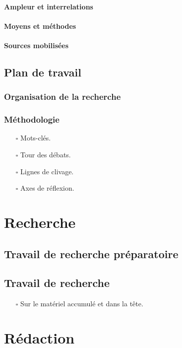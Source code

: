 \documentclass[paper=A4,portrait,twoside=true,twocolumn=false,headinclude=false,footinclude=false,fontsize=11,BCOR=15mm,DIV=calc,pagesize=auto,titlepage=firstiscover,mpinclude=true,headings=normal,headings=twolinechapter,open=right,chapterprefix=false,headsepline=false,parskip=full]{scrbook}
\begin{document}
\subsection{Ampleur et interrelations}
\label{sec:org7a3e424}
\subsection{Moyens et méthodes}
\label{sec:org43f9647}
\subsection{Sources mobilisées}
\label{sec:org2193cf1}
\chapter{Plan de travail}
\label{sec:org1001922}
\section{Organisation de la recherche}
\label{sec:orgc4cc988}
\section{Méthodologie}
\label{sec:org47f32f3}
\begin{itemize}
\item[{$\square$}] Mots-clés.
\item[{$\square$}] Tour des débats.
\item[{$\square$}] Lignes de clivage.
\item[{$\square$}] Axes de réflexion.
\end{itemize}
\part{Recherche}
\label{sec:org9a1ddb7}
\chapter{Travail de recherche préparatoire}
\label{sec:orgc049a7f}
\chapter{Travail de recherche}
\label{sec:org02e558c}
\begin{itemize}
\item[{$\square$}] Sur le matériel accumulé et dans la tête.
\end{itemize}
\part{Rédaction}
\label{sec:org6e7c825}
\end{document}
